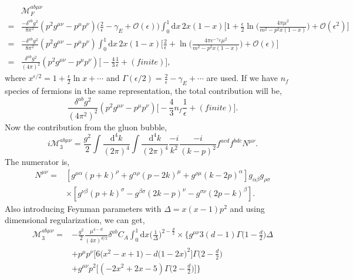 \documentclass[a4paper,12pt]{article}
\renewcommand{\d}{\mathrm{d}}
\begin{document}
\begin{equation}
    \begin{split}
    &\mathcal{M}_{F}^{ab \mu \nu}\\
    =&\frac{-\delta^{ab}g^2}{8\pi^2} (p^2g^{\mu \nu}-p^\mu p^\nu)\Big(\frac{2}{\epsilon}-\gamma_E+\mathcal{O}(\epsilon)\Big)\int_0^1 \d x\,2x(1-x)\bigg[1+\frac{\epsilon}{2}\ln\bigg(\frac{4\pi \mu^2}{m^2-p^2x(1-x)}\bigg)+\mathcal{O}(\epsilon^2) \bigg]\\
    =&\frac{-\delta^{ab}g^2}{8\pi^2} (p^2g^{\mu \nu}-p^\mu p^\nu)\int_0^1 \d x\,2x(1-x)\bigg[\frac{2}{\epsilon}+\ln\bigg(\frac{4\pi e^{-\gamma_E}\mu^2}{m^2-p^2x(1-x)}\bigg)+\mathcal{O}(\epsilon) \bigg]\\
    =&\frac{\delta^{ab}g^2}{(4\pi)^2} (p^2g^{\mu \nu}-p^\mu p^\nu)\bigg[-\frac{4}{3}\frac{1}{\epsilon}+(finite) \bigg],
    \end{split}
\end{equation}
where $x^{\epsilon/2}=1+\frac{\epsilon}{2}\ln x+\cdots$ and $\Gamma(\epsilon/2)=\frac{2}{\epsilon}-\gamma_E+\cdots$ are used. If we have $n_f$ species of fermions in the same representation, the total contribution will be,
\begin{equation}
    \frac{\delta^{ab}g^2}{(4\pi^2)^2} (p^2g^{\mu \nu}-p^\mu p^\nu)\bigg[-\frac{4}{3}n_f\frac{1}{\epsilon}+(finite) \bigg].
\end{equation}
Now the contribution from the gluon bubble,
\begin{equation}
    i\mathcal{M}_3^{ab \mu \nu}=\frac{g^2}{2}\int \frac{\d^4 k}{(2\pi)^4}\int \frac{\d^4 k}{(2\pi)^4}\frac{-i}{k^2}\frac{-i}{(k-p)^2}f^{acd}f^{bdc}N^{\mu \nu}.
\end{equation}
The numerator is,
\begin{equation}
    \begin{split}
        N^{\mu\nu}=&\left[g^{\mu\alpha}\left(p+k\right)^{\rho}+g^{\alpha\rho}\left(p-2k\right)^{\mu}+g^{\rho\mu}\left(k-2p\right)^{\alpha}\right]g_{\alpha\beta}g_{\rho\sigma}\\
        &\times\left[g^{\nu\beta}(p+k)^{\sigma}-g^{\beta\sigma}(2k-p)^{\nu}-g^{\sigma\nu}(2p-k)^{\beta}\right].
    \end{split}
\end{equation}
Also introducing Feynman parameters with $\Delta=x(x-1)p^2$  and using dimensional regularization, we can get,
\begin{equation}
    \begin{split}
        \mathcal{M}_{3}^{ab\mu\nu}=&-\frac{g^{2}}{2}\frac{\mu^{4-d}}{\left(4\pi\right)^{d/2}}\delta^{ab}C_{A}\int_{0}^{1}\d x\biggl(\frac{1}{\Delta}\biggr)^{2-\frac{d}{2}}\times\bigg\{g^{\mu\nu}3(d-1) \Gamma\biggl(1-\frac{d}{2}\biggr)\Delta\\
        &+p^{\mu}p^{\nu}\bigg[6\big(x^{2}-x+1\big)-d\big(1-2x\big)^{2}\bigg]\Gamma\bigg(2-\frac{d}{2}\bigg)\\
        &+ g^{\mu\nu}p^{2}\bigg[\left(-2x^{2}+2x-5\right)\Gamma\bigg(2-\frac{d}{2}\bigg)\bigg]\bigg\}
    \end{split}
\end{equation}
\end{document}
